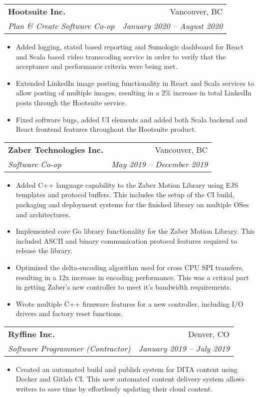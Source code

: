 \documentclass[letterpaper,11pt]{article}
\makeatletter
\newcommand{\resumeItem}[2]{
  \item\small{
    \textbf{#1}{#2 \vspace{-2pt}}
  }
}
\newcommand{\resumeSubheading}[4]{
  \vspace{-1pt}\item
    \begin{tabular*}{0.97\textwidth}[t]{l@{\extracolsep{\fill}}r}
      \textbf{#1} & #2 \\
      \textit{\small#3} & \textit{\small #4} \\
    \end{tabular*}\vspace{-5pt}
}
\newcommand{\resumeItemListStart}{\begin{itemize}}
\newcommand{\resumeItemListEnd}{\end{itemize}\vspace{-5pt}}
\makeatother
\begin{document}
    \resumeSubheading
      {Hootsuite Inc.}{Vancouver, BC}
      {Plan \& Create Software Co-op}{January 2020 -- August 2020}
      \resumeItemListStart
        \resumeItem{} {Added logging, statsd based reporting and Sumologic dashboard for React and Scala based video transcoding service in order to verify that the acceptance and performance criteria were being met.}
        \resumeItem{} {Extended LinkedIn image posting functionality in React and Scala services to allow posting of multiple images, resulting in a 2\% increase in total LinkedIn posts through the Hootsuite service.}
        \resumeItem{} {Fixed software bugs, added UI elements and added both Scala backend and React frontend features throughout the Hootsuite product.}
      \resumeItemListEnd

    \resumeSubheading
      {Zaber Technologies Inc.}{Vancouver, BC}
      {Software Co-op}{May 2019 -- December 2019}
      \resumeItemListStart
        \resumeItem{} {Added C++ language capability to the Zaber Motion Library using EJS templates and protocol buffers. This includes the setup of the CI build, packaging and deployment systems for the finished library on multiple OSes and architectures.}
        \resumeItem{} {Implemented core Go library functionality for the Zaber Motion Library. This included ASCII and binary communication protocol features required to release the library.}
        \resumeItem{} {Optimized the delta-encoding algorithm used for cross CPU SPI transfers, resulting in a 12x increase in encoding performance. This was a critical part in getting Zaber's new controller to meet it's bandwidth requirements.}
        \resumeItem{} {Wrote multiple C++ firmware features for a new controller, including I/O drivers and factory reset functions.}
      \resumeItemListEnd

    \resumeSubheading
      {Ryffine Inc.}{Denver, CO}
      {Software Programmer (Contractor)}{January 2019 -- July 2019}
      \resumeItemListStart
        \resumeItem{} {Created an automated build and publish system for DITA content using Docker and Gitlab CI. This new automated content delivery system allows writers to save time by effortlessly updating their cloud content.}
      \resumeItemListEnd
\end{document}
